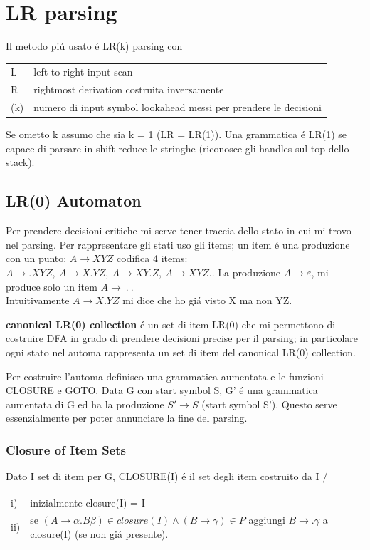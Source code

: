 \section{LR parsing}
Il metodo pi\'u usato \'e LR(k) parsing con 
\begin{tabular}{ll}
    L   &   left to right input scan\\
    R   &   rightmost derivation costruita inversamente\\
    (k) &   numero di input symbol lookahead messi per prendere le decisioni\\
\end{tabular}

Se ometto k assumo che sia k = 1 (LR = LR(1)). Una grammatica \'e LR(1) se capace di parsare in shift reduce le stringhe (riconosce gli 
handles sul top dello stack).

\subsection{LR(0) Automaton}
Per prendere decisioni critiche mi serve tener traccia dello stato in cui mi trovo nel parsing. Per rappresentare gli stati uso gli items;
un item \'e una produzione con un punto: $A \rightarrow XYZ$ codifica 4 items: 
$A \rightarrow .XYZ,\ A \rightarrow X.YZ,\ A \rightarrow XY.Z,\ A \rightarrow XYZ.$.
La produzione $A \rightarrow \varepsilon$, mi produce solo un item $A \rightarrow\ .\ $. \\


Intuitivamente $A \rightarrow X.YZ$ mi dice che ho gi\'a visto X ma non YZ.

\textbf{canonical LR(0) collection} \'e un set di item LR(0) che mi permettono di costruire DFA in grado di prendere decisioni
precise per il parsing; in particolare ogni stato nel automa rappresenta un set di item del canonical LR(0) collection.

Per costruire l'automa definisco una grammatica aumentata e le funzioni CLOSURE e GOTO. 
Data G con start symbol S, G' \'e una grammatica aumentata di G ed ha la produzione $S' \rightarrow S$ (start symbol S').
Questo serve essenzialmente per poter annunciare la fine del parsing.

\subsubsection{Closure of Item Sets}
Dato I set di item per G, CLOSURE(I) \'e il set degli item costruito da I $ / $ \\[5pt]
\begin{tabular}{ll}
    i)  &   inizialmente closure(I) = I \\
    ii) &   se $(A \rightarrow \alpha . B \beta) \in closure(I) \land (B \rightarrow \gamma) \in P$ 
           aggiungi $B \rightarrow .\gamma$ a closure(I) (se non gi\'a presente).\\
\end{tabular}\\[5pt]

